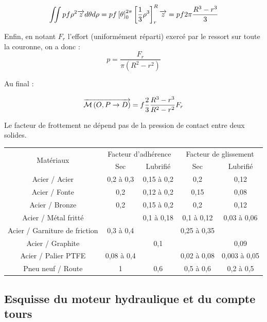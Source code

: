 \documentclass[10pt]{article}
\begin{document}
\begin{eqnarray*}
\iint pf\rho^2 \overrightarrow{z} d\theta d\rho =
pf \left[ \theta\right]_{0}^{2\pi}\left[ \dfrac{1}{3}\rho^3\right]_{r}^{R} \overrightarrow{z}
= pf2\pi \dfrac{R^3-r^3}{3} 
\end{eqnarray*} 

Enfin, en notant $F_r$ l'effort (uniformément réparti) exercé par le ressort sur toute la couronne, on a donc :
$$
p=\dfrac{F_r}{\pi \left(R^2-r^2 \right)}
$$

Au final : 

$$ \overrightarrow{\mathcal{M}\left( {O}, {P} \rightarrow {D}\right)}  
= f\dfrac{2}{3} \dfrac{R^3-r^3}{R^2-r^2} F_r
$$


Le facteur de frottement ne dépend pas de la pression de contact entre deux solides.

\begin{center}
\begin{tabular}{|c||c|c||c|c|}
\hline
\multirow{2}{*}{Matériaux} 
& \multicolumn{2}{c||}{Facteur d'adhérence} & \multicolumn{2}{c|}{Facteur de glissement} \\
\cline{2-5}
& Sec & Lubrifié & Sec & Lubrifié \\
\hline
\hline
Acier / Acier & 0,2 à 0,3 & 0,15 à 0,2 & 0,2 & 0,12 \\ \hline
Acier / Fonte & 0,2 & 0,12 à 0,2 & 0,15 & 0,08 \\ \hline
Acier / Bronze & 0,2 & 0,15 à 0,2 & 0,2 & 0,12 \\ \hline
Acier / Métal fritté &  & 0,1 à 0,18 & 0,1 à 0,12 & 0,03 à 0,06 \\ \hline
Acier / Garniture de friction & 0,3 à 0,4 &  & 0,25 à 0,35 &  \\ \hline
Acier / Graphite &  & 0,1 &  & 0,09 \\ \hline
Acier / Palier PTFE & 0,08 à 0,4 &  & 0,02 à 0,08 & 0,003 à 0,05 \\ \hline
Pneu neuf / Route & 1 & 0,6  & 0,5 à 0,6  & 0,2 à 0,5\\ \hline
\end{tabular}
\end{center}



\subsection*{Esquisse du moteur hydraulique et du compte tours}
\end{document}
